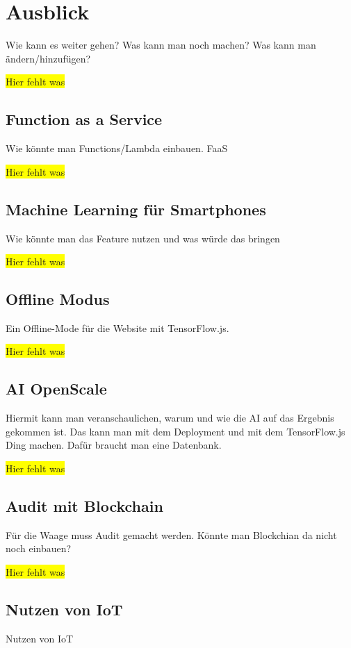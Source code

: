 \chapter{Ausblick}
\label{ch:ausblick}
Wie kann es weiter gehen? Was kann man noch machen? Was kann man ändern/hinzufügen?

\colorbox{yellow}{Hier fehlt was}

\section{Function as a Service}
Wie könnte man Functions/Lambda einbauen. FaaS

\colorbox{yellow}{Hier fehlt was}

\section{Machine Learning für Smartphones}
Wie könnte man das Feature nutzen und was würde das bringen

\colorbox{yellow}{Hier fehlt was}

\section{Offline Modus}
Ein Offline-Mode für die Website mit TensorFlow.js.

\colorbox{yellow}{Hier fehlt was}

\section{AI OpenScale}
Hiermit kann man veranschaulichen, warum und wie die AI auf das Ergebnis gekommen ist. Das kann man mit dem Deployment
und mit dem TensorFlow.js Ding machen. Dafür braucht man eine Datenbank.

\colorbox{yellow}{Hier fehlt was}

\section{Audit mit Blockchain}
Für die Waage muss Audit gemacht werden. Könnte man Blockchian da nicht noch einbauen?

\colorbox{yellow}{Hier fehlt was}

\section{Nutzen von IoT}
Nutzen von IoT

